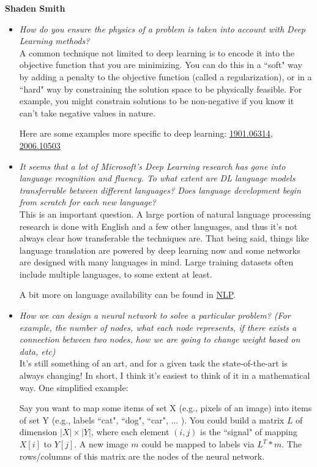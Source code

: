 \documentclass[11pt]{homework}
\begin{document}
\large{\bf Shaden Smith}
\small

\begin{itemize}
  

\item {\em How do you ensure the physics of a problem is taken into account with Deep Learning methods?} \\
A common technique not limited to deep learning is to encode it into the objective function that you are minimizing. You can do this in a ``soft" way by adding a penalty to the objective function (called a regularization), or in a ``hard" way by constraining the solution space to be physically feasible. For example, you might constrain solutions to be non-negative if you know it can't take negative values in nature.

Here are some examples more specific to deep learning: \href{https://arxiv.org/abs/1901.06314}{1901.06314}, \href{https://arxiv.org/abs/2006.10503}{2006.10503}

\item {\em It seems that a lot of Microsoft's Deep Learning research has gone into language recognition and fluency. To what extent are DL language models transferrable between different languages? Does language development begin from scratch for each new language?}\\
This is an important question. A large portion of natural language processing research is done with English and a few other languages, and thus it's not always clear how transferable the techniques are. That being said, things like language translation are powered by deep learning now and some networks are designed with many languages in mind. Large training datasets often include multiple languages, to some extent at least.

A bit more on language availability can be found in \href{https://thegradient.pub/the-benderrule-on-naming-the-languages-we-study-and-why-it-matters/}{NLP}.

\item {\em How we can design a neural network to solve a particular problem? (For example, the number of nodes, what each node represents, if there exists a connection between two nodes, how we are going to change weight based on data, etc)} \\
It's still something of an art, and for a given task the state-of-the-art is always changing! In short, I think it's easiest to think of it in a mathematical way. One simplified example:

Say you want to map some items of set X (e.g., pixels of an image) into items of set Y (e.g., labels ``cat", ``dog", ``car", ... ).   You could build a matrix $L$ of dimension $|X| \times |Y|$, where each element $(i, j)$ is the ``signal" of mapping $X[i]$ to $Y[j]$. A new image $m$ could be mapped to labels via $L^T * m$. The rows/columns of this matrix are the nodes of the neural network.


\end{itemize}
\end{document}
